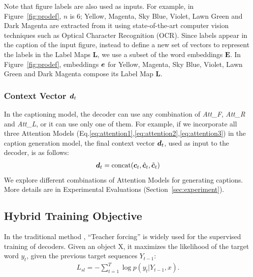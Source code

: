 \documentclass[11pt,a4paper]{article}
\begin{document}
Note that figure labels are also used as inputs. For example, in Figure~\ref{fig:prodef}, $n$ is 6; Yellow, Magenta, Sky Blue, Violet, Lawn Green and Dark Magenta are extracted from it using state-of-the-art computer vision techniques such as Optical Character Recognition (OCR).
Since labels appear in the caption of the input figure, instead to define a new set of vectors to represent the labels in the Label Maps $\bm{L}$, we use a subset of the word embeddings $\bm{E}$. In Figure~\ref{fig:prodef}, embeddings ${\boldsymbol e}$ for Yellow, Magenta, Sky Blue, Violet, Lawn Green and Dark Magenta compose its Label Map $\bm{L}$. 




\subsubsection{Context Vector ${\boldsymbol d}_t$}
In the captioning model, the decoder can use any combination of \textit{Att\_F}, \textit{Att\_R} and \textit{Att\_L}, or it can use only one of them. For example, if we incorporate all three Attention Models (Eq.\ref{eq:attention1},\ref{eq:attention2},\ref{eq:attention3}) in the caption generation model, the final context vector ${\boldsymbol d}_t$, used as input to the decoder, is as follows:
\begin{align}
{\boldsymbol d}_t = \text{concat}({\boldsymbol c}_t, \hat{{\boldsymbol c}}_t, \tilde{{\boldsymbol c}}_t)
\end{align}
We explore different combinations of Attention Models for generating captions. More details are in Experimental Evaluations (Section~\ref{sec:experiment}).


\subsection{Hybrid Training Objective}
\label{sec:loss}

In the traditional method \cite{williams1989learning}, ``Teacher forcing''  is widely used for the supervised training of decoders. Given an object X, it maximizes the likelihood of the target word $y_t$, given the previous target sequences $Y_{t-1}$:
\begin{align}
L_{sl} = -\sum_{t=1}^{T} \log p(y_t | Y_{t-1}, x).
\label{eq:ml-loss}
\end{align}
\end{document}

